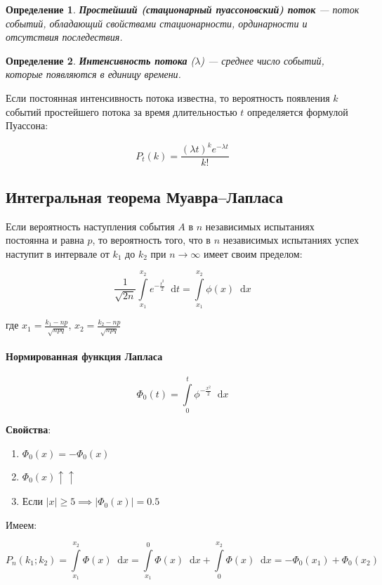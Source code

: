 \documentclass{article}
\newcommand*\diff{\mathop{}\!\mathrm{d}}
\newtheorem{definition}{Определение}
\begin{document}
\begin{definition}
    \textbf{Простейший (стационарный пуассоновский) поток} — поток событий, обладающий свойствами стационарности, ординарности и отсутствия последествия.
\end{definition}

\begin{definition}
    \textbf{Интенсивность потока} ($\lambda$) — среднее число событий, которые появляются в единицу времени.
\end{definition}

Если постоянная интенсивность потока известна, то вероятность появления $k$ событий простейшего потока за время длительностью $t$ определяется формулой Пуассона:

$$
P_{t}(k) = \frac{(\lambda t)^{k} e^{-\lambda t}}{k!}
$$

\subsection{Интегральная теорема Муавра–Лапласа}

Если вероятность наступления события $A$ в $n$ независимых испытаниях постоянна и равна $p$, то вероятность того, что в $n$ независимых испытаниях успех наступит в интервале от $k_1$ до $k_2$ при $n \to \infty$ имеет своим пределом:

$$
\frac{1}{\sqrt{2n}} \int\limits_{x_1}^{x_2} e^{-\frac{t^2}{2}} \diff t = \int\limits_{x_1}^{x_2} \phi(x) \diff x
$$


где $x_1 = \frac{k_1 - np}{\sqrt{npq}}$, $x_2 = \frac{k_2 - np}{\sqrt{npq}}$

\paragraph{Нормированная функция Лапласа}

$$\Phi_{0}(t) = \int\limits_{0}^{t} \phi^{-\frac{x^2}{2}} \diff x$$

\textbf{Свойства}:

\begin{enumerate}
    \item $\Phi_0(x) = -\Phi_0(x)$
    \item $\Phi_0(x) \uparrow \uparrow$
    \item Если $|x| \ge 5 \implies |\Phi_0(x)| = 0.5$ 
\end{enumerate}

Имеем:

$$P_{n}(k_1; k_2) = \int\limits_{x_1}^{x_2} \Phi(x) \diff x = \int\limits_{x_1}^{0} \Phi(x) \diff x + \int\limits_{0}^{x_2} \Phi(x) \diff x = -\Phi_0(x_1) + \Phi_0(x_2)$$
\end{document}
